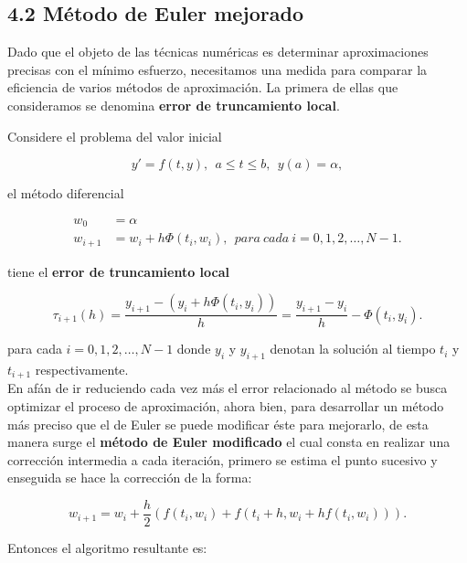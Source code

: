\subsection*{4.2 Método de Euler mejorado}

Dado que el objeto de las técnicas numéricas es determinar aproximaciones precisas con el mínimo esfuerzo, necesitamos una medida para comparar la eficiencia de varios métodos de aproximación. La primera de ellas que consideramos se denomina \textbf{error de truncamiento local}.

Considere el problema del valor inicial

\begin{equation*}
    y'=f(t,y), \ \  a\leq t\leq b, \ \ y(a)=\alpha, 
\end{equation*}

el método diferencial

\begin{equation*}
\begin{split}
    w_0&=\alpha \\
    w_{i+1}&=w_i+h\Phi(t_i,w_i), \ \ para \ cada \ i=0,1,2, \dotsc, N-1.
\end{split}
\end{equation*}

tiene el \textbf{error de truncamiento local}

\begin{equation*}
    \tau_{i+1}(h)=\frac{y_{i+1}-(y_i+h\Phi(t_i,y_i))}{h}=\frac{y_{i+1}-y_i}{h}-\Phi(t_i,y_i).
\end{equation*}

para cada $i=0,1,2, \dotsc, N-1$ donde $y_i$ y $y_{i+1}$ denotan la solución al tiempo $t_i$ y $t_{i+1}$ respectivamente.
\\

En afán de ir reduciendo cada vez más el error relacionado al método se busca optimizar el proceso de aproximación, ahora bien, para desarrollar un método más preciso que el de Euler se puede modificar éste para mejorarlo, de esta manera surge el \textbf{método de Euler modificado} el cual consta en realizar una corrección intermedia a cada iteración, primero se estima el punto sucesivo y enseguida se hace la corrección de la forma:

\begin{equation*}
    w_{i+1}=w_i+\frac{h}{2}(f(t_i,w_i)+f(t_i+h,w_i+hf(t_i,w_i))).
\end{equation*}

Entonces el algoritmo resultante es:

